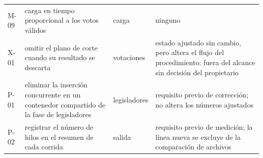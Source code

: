 \begin{longtable}{L{0.8cm}L{5.3cm}L{2.2cm}L{4.0cm}}
M-09 & carga en tiempo proporcional a los votos válidos & carga & ninguno \\
\addlinespace
X-01 & omitir el plano de corte cuando su resultado se descarta & votaciones & estado
ajustado sin cambio, pero altera el flujo del procedimiento: fuera del alcance sin decisión
del propietario \\
\addlinespace
P-01 & eliminar la inserción concurrente en un contenedor compartido de la fase de
legisladores & legisladores & requisito previo de corrección; no altera los números
ajustados \\
P-02 & registrar el número de hilos en el resumen de cada corrida & salida & requisito
previo de medición; la línea nueva se excluye de la comparación de archivos \\
\end{longtable}
\normalsize

